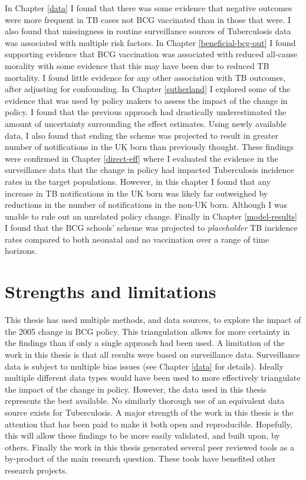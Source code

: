 \documentclass[11pt,twoside]{bristolthesis}
\begin{document}
  In Chapter \ref{data} I found that there was some evidence that negative outcomes were more frequent in TB cases not BCG vaccinated than in those that were. I also found that missingness in routine surveillance sources of Tuberculosis data was associated with multiple risk factors. In Chapter \ref{beneficial-bcg-out} I found supporting evidence that BCG vaccination was associated with reduced all-cause morality with some evidence that this may have been due to reduced TB mortality. I found little evidence for any other association with TB outcomes, after adjusting for confounding. In Chapter \ref{sutherland} I explored some of the evidence that was used by policy makers to assess the impact of the change in policy. I found that the previous approach had drastically underestimated the amount of uncertainty surrounding the effect estimates. Using newly available data, I also found that ending the scheme was projected to result in greater number of notifications in the UK born than previously thought. These findings were confirmed in Chapter \ref{direct-eff} where I evaluated the evidence in the surveillance data that the change in policy had impacted Tuberculosis incidence rates in the target populations. However, in this chapter I found that any increase in TB notifications in the UK born was likely far outweighed by reductions in the number of notifications in the non-UK born. Although I was unable to rule out an unrelated policy change. Finally in Chapter \ref{model-results} I found that the BCG schools' scheme was projected to \emph{placeholder} TB incidence rates compared to both neonatal and no vaccination over a range of time horizons.
  
  \hypertarget{strengths-and-limitations}{%
  \section{Strengths and limitations}\label{strengths-and-limitations}}
  
  This thesis has used multiple methods, and data sources, to explore the impact of the 2005 change in BCG policy. This triangulation allows for more certainty in the findings than if only a single approach had been used. A limitation of the work in this thesis is that all results were based on surveillance data. Surveillance data is subject to multiple bias issues (see Chapter \ref{data} for details). Ideally multiple different data types would have been used to more effectively triangulate the impact of the change in policy. However, the data used in this thesis represents the best available. No similarly thorough use of an equivalent data source exists for Tuberculosis. A major strength of the work in this thesis is the attention that has been paid to make it both open and reproducible. Hopefully, this will allow these findings to be more easily validated, and built upon, by others. Finally the work in this thesis generated several peer reviewed tools as a by-product of the main research question. These tools have benefited other research projects.
  
\end{document}
